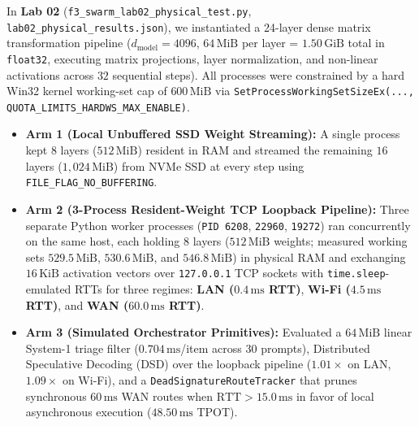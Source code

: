 \documentclass[10pt,a4paper]{article}
\begin{document}
In \textbf{Lab 02} (\texttt{f3\_swarm\_lab02\_physical\_test.py}, \texttt{lab02\_physical\_results.json}), we instantiated a 24-layer dense matrix transformation pipeline ($d_{\text{model}} = 4096$, $64\,\text{MiB}$ per layer = $1.50\,\text{GiB}$ total in \texttt{float32}, executing matrix projections, layer normalization, and non-linear activations across $32$ sequential steps). All processes were constrained by a hard Win32 kernel working-set cap of \textbf{$600\,\text{MiB}$} via \texttt{SetProcessWorkingSetSizeEx(..., QUOTA\_LIMITS\_HARDWS\_MAX\_ENABLE)}.
\begin{itemize}
    \item \textbf{Arm 1 (Local Unbuffered SSD Weight Streaming):} A single process kept $8$ layers ($512\,\text{MiB}$) resident in RAM and streamed the remaining $16$ layers ($1,024\,\text{MiB}$) from NVMe SSD at every step using \texttt{FILE\_FLAG\_NO\_BUFFERING}.
    \item \textbf{Arm 2 (3-Process Resident-Weight TCP Loopback Pipeline):} Three separate Python worker processes (\texttt{PID 6208}, \texttt{22960}, \texttt{19272}) ran concurrently on the same host, each holding $8$ layers ($512\,\text{MiB}$ weights; measured working sets $529.5\,\text{MiB}$, $530.6\,\text{MiB}$, and $546.8\,\text{MiB}$) in physical RAM and exchanging $16\,\text{KiB}$ activation vectors over \texttt{127.0.0.1} TCP sockets with \texttt{time.sleep}-emulated RTTs for three regimes: \textbf{LAN ($0.4\,\text{ms}$ RTT)}, \textbf{Wi-Fi ($4.5\,\text{ms}$ RTT)}, and \textbf{WAN ($60.0\,\text{ms}$ RTT)}.
    \item \textbf{Arm 3 (Simulated Orchestrator Primitives):} Evaluated a $64\,\text{MiB}$ linear System-1 triage filter ($0.704\,\text{ms}$/item across $30$ prompts), Distributed Speculative Decoding (DSD) over the loopback pipeline ($1.01\times$ on LAN, $1.09\times$ on Wi-Fi), and a \texttt{DeadSignatureRouteTracker} that prunes synchronous $60\,\text{ms}$ WAN routes when $\text{RTT} > 15.0\,\text{ms}$ in favor of local asynchronous execution ($48.50\,\text{ms}$ TPOT).
\end{itemize}
\end{document}
